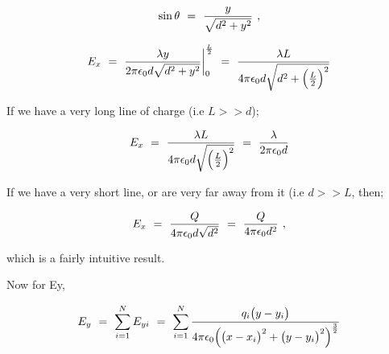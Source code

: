 \documentclass{article}
\begin{document}
\begin{equation} \label{eq:37}
\sin{\theta} \hspace{0.125cm} = \hspace{0.125cm} \frac{y}{\sqrt{d^2 + y^2}} \hspace{0.125cm} ,
\end{equation}

\begin{equation} \label{eq:38}
E_{x} \hspace{0.125cm} = \hspace{0.125cm} \frac{\lambda y}{2\pi \epsilon_{0} d \sqrt{d^2 + y^2}} \bigg|_{0}^{\frac{L}{2}} \hspace{0.125cm} = \hspace{0.125cm} \frac{\lambda L}{4\pi \epsilon_{0} d \sqrt{d^2 + \Big(\frac{L}{2}\Big)^{2}}}
\end{equation}

If we have a very long line of charge (i.e \begin{math} L >> d \end{math});

\begin{equation} \label{eq:39}
E_{x} \hspace{0.125cm} = \hspace{0.125cm} \frac{\lambda L}{4\pi \epsilon_{0} d \sqrt{\Big(\frac{L}{2}\Big)^{2}}} \hspace{0.125cm} = \hspace{0.125cm} \frac{\lambda}{2\pi \epsilon_{0} d}
\end{equation}

If we have a very short line, or are very far away from it (i.e \begin{math} d >> L \end{math}, then;

\begin{equation} \label{eq:40}
E_{x} \hspace{0.125cm} = \hspace{0.125cm} \frac{Q}{4\pi \epsilon_{0} d \sqrt{d^2}} \hspace{0.125cm} = \hspace{0.125cm} \frac{Q}{4\pi \epsilon_{0} d^{2}} \hspace{0.125cm} , 
\end{equation}

which is a fairly intuitive result. 

Now for Ey, 

\begin{equation} \label{eq:41}
E_{y} \hspace{0.125cm} = \hspace{0.125cm} \sum_{i=1}^{N} E_{yi} \hspace{0.125cm} = \hspace{0.125cm} \sum_{i=1}^{N} \frac{q_{i}\big(y - y_{i}\big)}{4\pi \epsilon_{0} \Big( \big(x - x_{i}\big)^2 + \big(y - y_{i}\big)^2 \Big)^{\frac{3}{2}}}
\end{equation}
\end{document}
